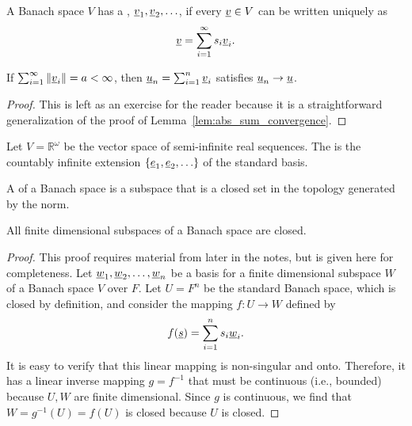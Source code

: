 \begin{definition}
A Banach space $V$ has a , $\underline{v}_1, \underline{v}_2, \ldots$, if every $\underline{v} \in V$ can be written uniquely as
\[ \underline{v} = \sum_{i=1}^\infty s_i \underline{v}_i. \]
\end{definition}

\begin{lemma} \label{lem:banach_sum_convergence}
If $\sum_{i=1}^\infty \| \underline{v}_i \| = a < \infty$, then $\underline{u}_n = \sum_{i=1}^n \underline{v}_i$ satisfies $\underline{u}_n \to \underline{u}$.
\end{lemma}
\begin{proof}
This is left as an exercise for the reader because it is a straightforward generalization of the proof of Lemma~\ref{lem:abs_sum_convergence}.
\end{proof}

\begin{example}
Let $V = \mathbb{R}^\omega$ be the vector space of semi-infinite real sequences.
The  is the countably infinite extension $\{\underline{e}_1 ,\underline{e}_2, \ldots \}$ of the standard basis.
\end{example}

\begin{definition}
A  of a Banach space is a subspace that is a closed set in the topology generated by the norm.
\end{definition}

\begin{theorem}
All finite dimensional subspaces of a Banach space are closed.
\end{theorem}
\begin{proof}
This proof requires material from later in the notes, but is given here for completeness.
Let $\underline{w}_1,\underline{w}_2,\ldots,\underline{w}_n$ be a basis for a finite dimensional subspace $W$ of a Banach space $V$ over $F$.
Let $U = F^n$ be the standard Banach space, which is closed by definition, and consider the mapping $f \colon U\rightarrow W$ defined by
\[ f(\underline{s}) = \sum_{i=1}^n s_i \underline{w}_i. \]
It is easy to verify that this linear mapping is non-singular and onto.
Therefore, it has a linear inverse mapping $g = f^{-1}$ that must be continuous (i.e., bounded) because $U,W$ are finite dimensional.
Since $g$ is continuous, we find that $W = g^{-1}(U) = f(U)$ is closed because $U$ is closed.
\end{proof}

